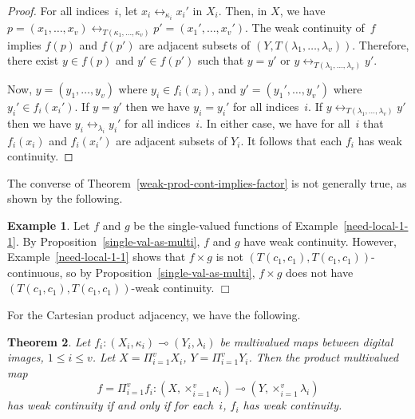 \documentclass{article}
\theoremstyle{plain}
\newtheorem{thm}{Theorem}
\theoremstyle{definition}
\newtheorem{exl}[thm]{Example}
\numberwithin{thm}{section}
\newcommand{\adj}{\leftrightarrow}
\begin{document}
\begin{proof}
For all indices~$i$, let $x_i \adj_{\kappa_i} x_i'$ in
$X_i$. Then, in $X$, we have
$p=(x_1,\ldots,x_v) \adj_{T(\kappa_1,\ldots,\kappa_v)} p'=(x_1',\ldots,x_v')$. The weak
continuity of~$f$ implies
$f(p)$ and $f(p')$ are adjacent
subsets of $(Y,T(\lambda_1,\ldots,\lambda_v))$. Therefore,
there exist $y \in f(p)$ and
$y' \in f(p')$ such that
$y=y'$ or $y \adj_{T(\lambda_1,\ldots,\lambda_v)} y'$.

Now, $y=(y_1,\ldots,y_v)$ where
$y_i \in f_i(x_i)$, and $y'=(y_1',\ldots,y_v')$ where
$y_i' \in f_i(x_i')$. If $y=y'$
then we have $y_i=y_i'$ for all
indices~$i$. If $y \adj_{T(\lambda_1,\ldots,\lambda_v)} y'$ then we have
$y_i \adj_{\lambda_i} y_i'$ for all indices~$i$. In either case,
we have for all~$i$ that $f_i(x_i)$ and $f_i(x_i')$ are adjacent subsets
of $Y_i$. It follows that each $f_i$ has weak continuity.
\end{proof}

The converse of Theorem~\ref{weak-prod-cont-implies-factor} is not generally true, as shown by the following.

\begin{exl}
\label{tensor-non-weak-prod}
Let $f$ and $g$ be the single-valued functions of
Example~\ref{need-local-1-1}. By Proposition~\ref{single-val-as-multi},
$f$ and $g$ have weak continuity. However, Example~\ref{need-local-1-1} shows 
that $f \times g$ is not $(T(c_1,c_1),T(c_1,c_1))$-continuous, so by
Proposition~\ref{single-val-as-multi}, $f \times g$ does not have
$(T(c_1,c_1),T(c_1,c_1))$-weak continuity. $\Box$
\end{exl}

For the Cartesian product adjacency, we have the following.

\begin{thm}
\label{weak-Cart-prod-implies-factor}
Let $f_i: (X_i,\kappa_i) \multimap (Y_i,\lambda_i)$ be
multivalued maps between digital
images, $1 \le i \le v$.
Let $X=\Pi_{i=1}^v X_i$, $Y=\Pi_{i=1}^v Y_i$. Then the product multivalued map
\[ f=\Pi_{i=1}^v f_i: (X, \times_{i=1}^v \kappa_i) \multimap (Y, \times_{i=1}^v \lambda_i) \]
has weak continuity if and only if for each~$i$,
$f_i$ has weak continuity.
\end{thm}
\end{document}
